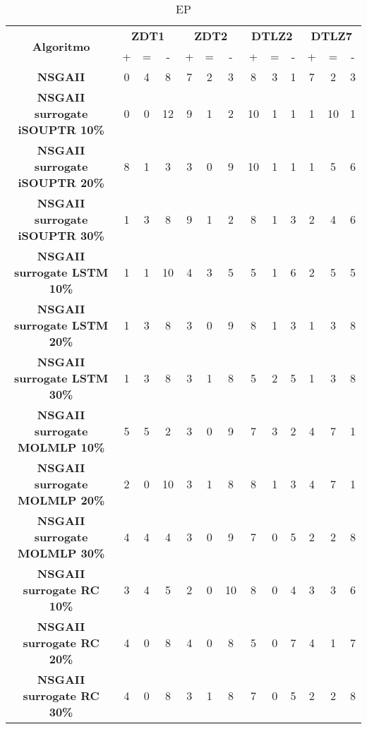 \begin{table}[h]
\centering
\begin{tabular}{|c|ccc|ccc|ccc|ccc|}
\hline\multirow{2}{*}{\textbf{Algoritmo}} & \multicolumn{3}{c|}{\textbf{ZDT1}} & \multicolumn{3}{c|}{\textbf{ZDT2}} & \multicolumn{3}{c|}{\textbf{DTLZ2}} & \multicolumn{3}{c|}{\textbf{DTLZ7}} \\ \cline{2-13}& + & = & - & + & = & - & + & = & - & + & = & - \\ \hline
\textbf{NSGAII} & 0 & 4 & 8 & 7 & 2 & 3 & 8 & 3 & 1 & 7 & 2 & 3\\
\textbf{NSGAII surrogate iSOUPTR 10\%} & 0 & 0 & 12 & 9 & 1 & 2 & 10 & 1 & 1 & 1 & 10 & 1\\
\textbf{NSGAII surrogate iSOUPTR 20\%} & 8 & 1 & 3 & 3 & 0 & 9 & 10 & 1 & 1 & 1 & 5 & 6\\
\textbf{NSGAII surrogate iSOUPTR 30\%} & 1 & 3 & 8 & 9 & 1 & 2 & 8 & 1 & 3 & 2 & 4 & 6\\
\textbf{NSGAII surrogate LSTM 10\%} & 1 & 1 & 10 & 4 & 3 & 5 & 5 & 1 & 6 & 2 & 5 & 5\\
\textbf{NSGAII surrogate LSTM 20\%} & 1 & 3 & 8 & 3 & 0 & 9 & 8 & 1 & 3 & 1 & 3 & 8\\
\textbf{NSGAII surrogate LSTM 30\%} & 1 & 3 & 8 & 3 & 1 & 8 & 5 & 2 & 5 & 1 & 3 & 8\\
\textbf{NSGAII surrogate MOLMLP 10\%} & 5 & 5 & 2 & 3 & 0 & 9 & 7 & 3 & 2 & 4 & 7 & 1\\
\textbf{NSGAII surrogate MOLMLP 20\%} & 2 & 0 & 10 & 3 & 1 & 8 & 8 & 1 & 3 & 4 & 7 & 1\\
\textbf{NSGAII surrogate MOLMLP 30\%} & 4 & 4 & 4 & 3 & 0 & 9 & 7 & 0 & 5 & 2 & 2 & 8\\
\textbf{NSGAII surrogate RC 10\%} & 3 & 4 & 5 & 2 & 0 & 10 & 8 & 0 & 4 & 3 & 3 & 6\\
\textbf{NSGAII surrogate RC 20\%} & 4 & 0 & 8 & 4 & 0 & 8 & 5 & 0 & 7 & 4 & 1 & 7\\
\textbf{NSGAII surrogate RC 30\%} & 4 & 0 & 8 & 3 & 1 & 8 & 7 & 0 & 5 & 2 & 2 & 8\\
\hline
\end{tabular}
\caption{EP}
\label{tabla:comparacion_EP}
\end{table}
